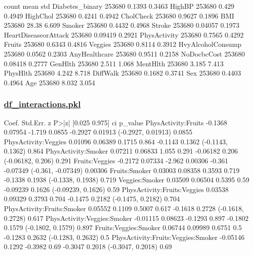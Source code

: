 \documentclass[11pt]{article}
\begin{document}
\begin{codeoutput}
                      count    mean    std
Diabetes_binary      253680  0.1393 0.3463
HighBP               253680   0.429 0.4949
HighChol             253680  0.4241 0.4942
CholCheck            253680  0.9627 0.1896
BMI                  253680   28.38  6.609
Smoker               253680  0.4432 0.4968
Stroke               253680 0.04057 0.1973
HeartDiseaseorAttack 253680 0.09419 0.2921
PhysActivity         253680  0.7565 0.4292
Fruits               253680  0.6343 0.4816
Veggies              253680  0.8114 0.3912
HvyAlcoholConsump    253680  0.0562 0.2303
AnyHealthcare        253680  0.9511 0.2158
NoDocbcCost          253680 0.08418 0.2777
GenHlth              253680   2.511  1.068
MentHlth             253680   3.185  7.413
PhysHlth             253680   4.242  8.718
DiffWalk             253680  0.1682 0.3741
Sex                  253680  0.4403 0.4964
Age                  253680   8.032  3.054
\end{codeoutput}
\hypertarget{file-df-interactions-pkl}{}

\subsubsection*{\hyperlink{code-df-interactions-pkl}{df\_interactions.pkl}}

\begin{codeoutput}
                                      Coef. Std.Err.       z    P>|z|   [0.025   0.975]                  ci  p_value
PhysActivity:Fruits                 -0.1368  0.07954  -1.719   0.0855  -0.2927  0.01913  (-0.2927, 0.01913)   0.0855
PhysActivity:Veggies                0.01096  0.06389  0.1715    0.864  -0.1143   0.1362   (-0.1143, 0.1362)    0.864
PhysActivity:Smoker                 0.07211  0.06833   1.055    0.291 -0.06182    0.206   (-0.06182, 0.206)    0.291
Fruits:Veggies                      -0.2172  0.07334  -2.962  0.00306   -0.361 -0.07349  (-0.361, -0.07349)  0.00306
Fruits:Smoker                       0.03003  0.08358  0.3593    0.719  -0.1338   0.1938   (-0.1338, 0.1938)    0.719
Veggies:Smoker                      0.03509  0.06504  0.5395     0.59 -0.09239   0.1626  (-0.09239, 0.1626)     0.59
PhysActivity:Fruits:Veggies         0.03538  0.09329  0.3793    0.704  -0.1475   0.2182   (-0.1475, 0.2182)    0.704
PhysActivity:Fruits:Smoker          0.05552   0.1109  0.5007    0.617  -0.1618   0.2728   (-0.1618, 0.2728)    0.617
PhysActivity:Veggies:Smoker        -0.01115  0.08623 -0.1293    0.897  -0.1802   0.1579   (-0.1802, 0.1579)    0.897
Fruits:Veggies:Smoker               0.06744  0.09989  0.6751      0.5  -0.1283   0.2632   (-0.1283, 0.2632)      0.5
PhysActivity:Fruits:Veggies:Smoker -0.05146   0.1292 -0.3982     0.69  -0.3047   0.2018   (-0.3047, 0.2018)     0.69
\end{codeoutput}
\hypertarget{file-df-lifestyle-combined-pkl}{}
\end{document}
